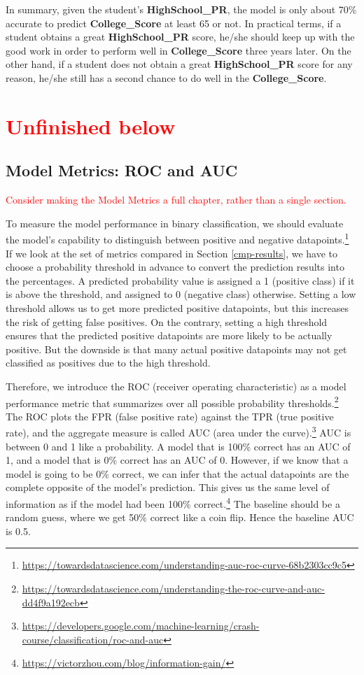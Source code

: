 \documentclass[
]{article}
\begin{document}
In summary, given the student's \textbf{HighSchool\_PR}, the model is
only about 70\% accurate to predict \textbf{College\_Score} at least 65
or not. In practical terms, if a student obtains a great
\textbf{HighSchool\_PR} score, he/she should keep up with the good work
in order to perform well in \textbf{College\_Score} three years later.
On the other hand, if a student does not obtain a great
\textbf{HighSchool\_PR} score for any reason, he/she still has a second
chance to do well in the \textbf{College\_Score}.

\section*{\textcolor{red}{Unfinished below}}

\hypertarget{roc-auc}{%
\subsection{Model Metrics: ROC and AUC}\label{roc-auc}}

\textcolor{red}{Consider making the Model Metrics a full chapter, rather than a single section.}

To measure the model performance in binary classification, we should
evaluate the model's capability to distinguish between positive and
negative datapoints.\footnote{\url{https://towardsdatascience.com/understanding-auc-roc-curve-68b2303cc9c5}}
If we look at the set of metrics compared in Section \ref{cmp-results},
we have to choose a probability threshold in advance to convert the
prediction results into the percentages. A predicted probability value
is assigned a 1 (positive class) if it is above the threshold, and
assigned to 0 (negative class) otherwise. Setting a low threshold allows
us to get more predicted positive datapoints, but this increases the
risk of getting false positives. On the contrary, setting a high
threshold ensures that the predicted positive datapoints are more likely
to be actually positive. But the downside is that many actual positive
datapoints may not get classified as positives due to the high
threshold.

Therefore, we introduce the ROC (receiver operating characteristic) as a
model performance metric that summarizes over all possible probability
thresholds.\footnote{\url{https://towardsdatascience.com/understanding-the-roc-curve-and-auc-dd4f9a192ecb}}
The ROC plots the FPR (false positive rate) against the TPR (true
positive rate), and the aggregate measure is called AUC (area under the
curve).\footnote{\url{https://developers.google.com/machine-learning/crash-course/classification/roc-and-auc}}
AUC is between 0 and 1 like a probability. A model that is 100\% correct
has an AUC of 1, and a model that is 0\% correct has an AUC of 0.
However, if we know that a model is going to be 0\% correct, we can
infer that the actual datapoints are the complete opposite of the
model's prediction. This gives us the same level of information as if
the model had been 100\% correct.\footnote{\url{https://victorzhou.com/blog/information-gain/}}
The baseline should be a random guess, where we get 50\% correct like a
coin flip. Hence the baseline AUC is 0.5.
\end{document}
